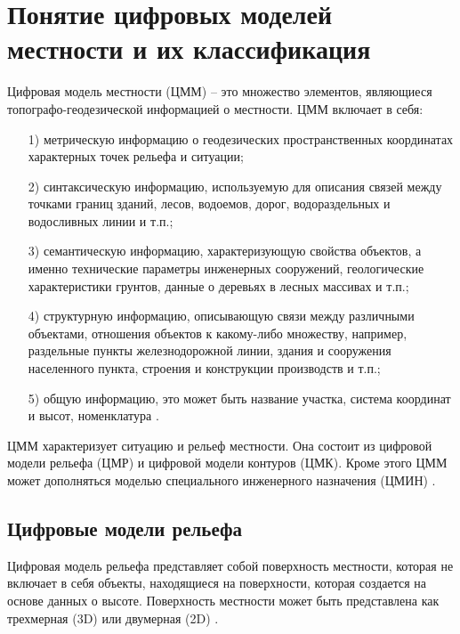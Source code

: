 \chapter{Понятие цифровых моделей местности и их классификация}

Цифровая модель местности (ЦММ) – это множество элементов, являющиеся топографо-геодезической информацией о местности.
ЦММ включает в себя: 

\begin{enumerate} 
  \item[1)] метрическую информацию о геодезических пространственных координатах характерных точек рельефа и ситуации;
  
  \item[2)] синтаксическую информацию, используемую для описания связей между точками границ зданий, лесов, водоемов, дорог, водораздельных и водосливных линии и т.п.;
  
  \item[3)] семантическую информацию, характеризующую свойства объектов, а именно технические параметры инженерных сооружений, геологические характеристики грунтов, данные о деревьях в лесных массивах и т.п.;
  
  \item[4)] структурную информацию, описывающую связи между различными объектами, отношения объектов к какому-либо множеству, например, раздельные пункты железнодорожной линии, здания и сооружения населенного пункта, строения и конструкции производств и т.п.;
  
  \item[5)] общую информацию, это может быть название участка, система координат и высот, номенклатура \cite{19,10}.
  
\end{enumerate} 


ЦММ характеризует ситуацию и рельеф местности. Она состоит из цифровой модели рельефа (ЦМР) и цифровой модели контуров (ЦМК). Кроме этого ЦММ может дополняться моделью специального инженерного назначения (ЦМИН) \cite{11}.

\section{Цифровые модели рельефа}

Цифровая модель рельефа представляет собой поверхность местности, которая не включает в себя объекты, находящиеся на поверхности, которая создается на основе данных о высоте. Поверхность местности может быть представлена как трехмерная (3D) или двумерная (2D) \cite {1, 23}.

